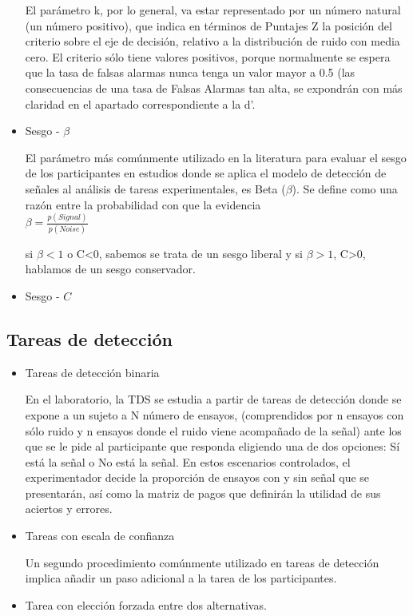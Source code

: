 \begin{itemize}
 El parámetro k, por lo general, va estar representado por un número natural (un número positivo), que indica en términos de Puntajes Z  la posición del criterio sobre el eje de decisión, relativo a la distribución de ruido con media cero. El criterio sólo tiene valores positivos, porque normalmente se espera que la tasa de falsas alarmas nunca tenga un valor mayor a 0.5 (las consecuencias de una tasa de Falsas Alarmas tan alta, se expondrán con más claridad en el apartado correspondiente a la d’. \\


\item Sesgo - $\beta$

El parámetro más comúnmente utilizado en la literatura para evaluar el sesgo de los participantes en estudios donde se aplica el modelo de detección de señales al análisis de tareas experimentales, es Beta ($\beta$). Se define como una razón entre la probabilidad con que la evidencia  \\

$\beta = \frac{p(Signal)}{p(Noise)}$

si $\beta<1$ o C<0, sabemos se trata de un sesgo liberal y si $\beta>1$, C>0, hablamos de un sesgo conservador.\\

\item Sesgo - $C$


\end{itemize}   %




\subsection{Tareas de detección}

\begin{itemize}
\item Tareas de detección binaria 

En el laboratorio, la  TDS se estudia a partir  de tareas de detección donde se expone a un  sujeto  a  N  número  de  ensayos,  (comprendidos  por  n  ensayos con  sólo  ruido  y  n  ensayos donde  el  ruido  viene  acompañado  de  la  señal)  ante  los  que  se  le  pide  al  participante  que responda eligiendo una de dos opciones: Sí está la señal o No está la señal. En estos escenarios controlados,  el  experimentador  decide  la  proporción  de  ensayos  con  y  sin  señal  que  se presentarán, así como la matriz de pagos que definirán la utilidad de sus aciertos y errores. \\


\item Tareas con escala de confianza

Un segundo procedimiento comúnmente utilizado en tareas de detección implica añadir un paso adicional a la tarea de los participantes. 


\item Tarea con elección forzada entre dos alternativas.
\end{itemize}

